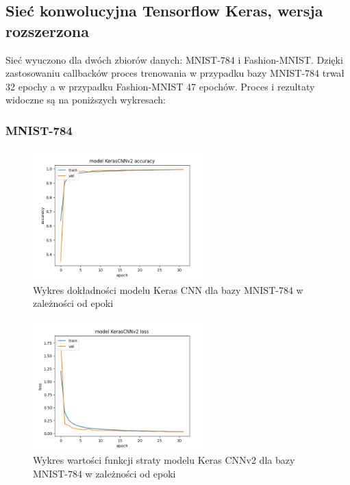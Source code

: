 \documentclass{article}
\begin{document}
\subsection{Sieć konwolucyjna Tensorflow Keras, wersja rozszerzona}
Sieć wyuczono dla dwóch zbiorów danych: MNIST-784 i Fashion-MNIST. Dzięki zastosowaniu callbacków proces trenowania w przypadku bazy MNIST-784 trwał 32 epochy a w przypadku Fashion-MNIST 47 epochów. Proces i rezultaty widoczne są na poniższych wykresach:

\subsubsection{MNIST-784}
\begin{figure}[H]
    \centering
    \includegraphics[width=0.6\textwidth]{../Saves/KerasCNNV2/mnist-784/KerasCNNV2_mnist_784_ep32_acc.png}
    \caption{Wykres dokładności modelu Keras CNN dla bazy MNIST-784 w zależności od epoki}
\end{figure}

\begin{figure}[H]
    \centering
    \includegraphics[width=0.6\textwidth]{../Saves/KerasCNNV2/mnist-784/KerasCNNV2_mnist_784_ep32_loss.png}
    \caption{Wykres wartości funkcji straty modelu Keras CNNv2 dla bazy MNIST-784 w zależności od epoki} 
\end{figure}
\end{document}
